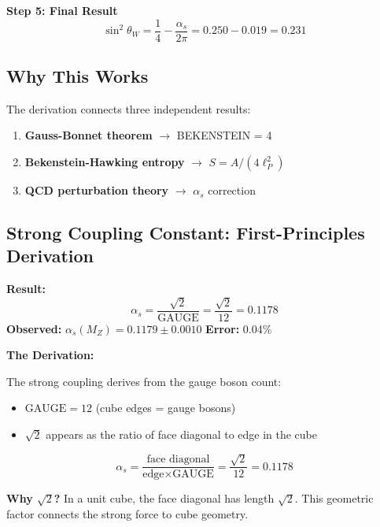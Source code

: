 \documentclass[12pt,a4paper]{article}
\newcommand{\sinW}{\sin^2\theta_W}
\newcommand{\GAUGE}{\text{GAUGE}}
\begin{document}
\textbf{Step 5: Final Result}
\begin{equation}
\boxed{\sinW = \frac{1}{4} - \frac{\alpha_s}{2\pi} = 0.250 - 0.019 = 0.231}
\end{equation}

\subsection{Why This Works}

The derivation connects three independent results:
\begin{enumerate}
    \item \textbf{Gauss-Bonnet theorem} $\to$ BEKENSTEIN = 4
    \item \textbf{Bekenstein-Hawking entropy} $\to$ $S = A/(4\ell_P^2)$
    \item \textbf{QCD perturbation theory} $\to$ $\alpha_s$ correction
\end{enumerate}

\subsection{Strong Coupling Constant: First-Principles Derivation}

\begin{derivedbox}
\textbf{Result:}
\begin{equation}
\alpha_s = \frac{\sqrt{2}}{\GAUGE} = \frac{\sqrt{2}}{12} = 0.1178
\end{equation}
\textbf{Observed:} $\alpha_s(M_Z) = 0.1179 \pm 0.0010$ \quad \textbf{Error:} 0.04\%
\end{derivedbox}

\textbf{The Derivation:}

The strong coupling derives from the gauge boson count:
\begin{itemize}
    \item $\GAUGE = 12$ (cube edges = gauge bosons)
    \item $\sqrt{2}$ appears as the ratio of face diagonal to edge in the cube
\end{itemize}

\begin{equation}
\boxed{\alpha_s = \frac{\text{face diagonal}}{\text{edge} \times \GAUGE} = \frac{\sqrt{2}}{12} = 0.1178}
\end{equation}

\textbf{Why $\sqrt{2}$?} In a unit cube, the face diagonal has length $\sqrt{2}$. This geometric factor connects the strong force to cube geometry.
\end{document}
